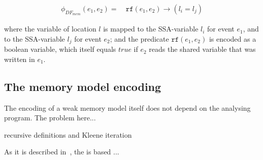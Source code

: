 \begin{align}
\phi_{DF_{mem}}(e_1, e_2) = \ & \mathtt{rf}(e_1, e_2) \rightarrow (l_i = l_j) 
\end{align}

where the variable of location $l$ is mapped to the SSA-variable $l_i$ for event $e_1$, and to the SSA-variable $l_j$ for event $e_2$; and the predicate $\mathtt{rf}(e_1, e_2)$ is encoded as a boolean variable, which itself equals $true$ if $e_2$ reads the shared variable that was written in $e_1$.


\subsection{The memory model encoding} %
\label{ch:port:enc:wmm}

The encoding of a weak memory model itself does not depend on the analysing program. The problem here...

recursive definitions and Kleene iteration

As it is described in~\cite{Porthos17}, the is based ...
